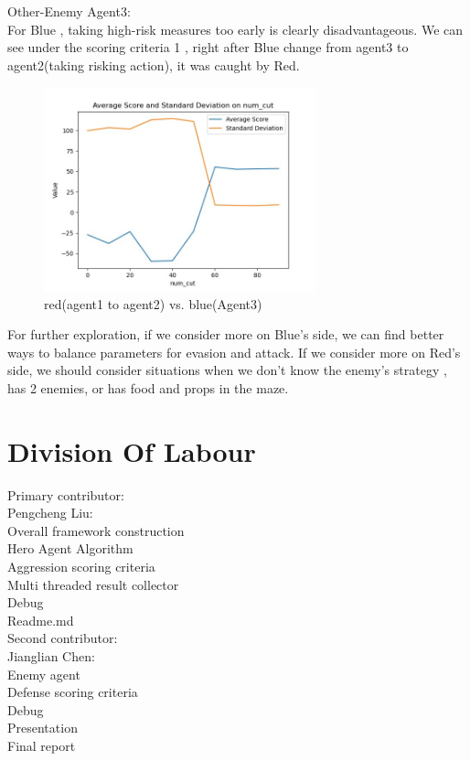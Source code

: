 \documentclass{article}
\begin{document}
Other-Enemy Agent3:\\
For Blue , taking high-risk measures too early is clearly disadvantageous. We can see under the scoring criteria 1 , right after Blue change from agent3 to agent2(taking risking action), it was caught by Red.\\

	\begin{figure}[H]
	\centering
	\includegraphics[width=0.7\textwidth]{r3.png}
	\caption{red(agent1 to agent2) vs. blue(Agent3)}
\end{figure} 

For further exploration, if we consider more on Blue's side, we can find better ways to balance parameters for evasion and attack.
If we consider more on Red's side, we should consider situations when we don't know the enemy's strategy , has 2 enemies, or has food and props in the maze.\\


\section{Division Of Labour}
Primary contributor: \\
Pengcheng Liu:\\
Overall framework construction\\
Hero Agent Algorithm\\
Aggression scoring criteria\\
Multi threaded result collector\\
Debug\\
Readme.md\\

Second contributor: \\
Jianglian Chen:\\
Enemy agent\\
Defense scoring criteria\\
Debug\\
Presentation\\
Final report\\
\end{document}

